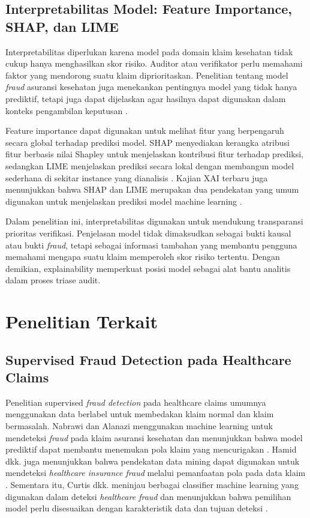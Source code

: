 \subsection{Interpretabilitas Model: Feature Importance, SHAP, dan LIME}\label{interpretabilitas-model-feature-importance-shap-dan-lime}

Interpretabilitas diperlukan karena model pada domain klaim kesehatan tidak cukup hanya menghasilkan skor risiko. Auditor atau verifikator perlu memahami faktor yang mendorong suatu klaim diprioritaskan. Penelitian tentang model \emph{fraud} asuransi kesehatan juga menekankan pentingnya model yang tidak hanya prediktif, tetapi juga dapat dijelaskan agar hasilnya dapat digunakan dalam konteks pengambilan keputusan \citep{wang2025}.

Feature importance dapat digunakan untuk melihat fitur yang berpengaruh secara global terhadap prediksi model. SHAP menyediakan kerangka atribusi fitur berbasis nilai Shapley untuk menjelaskan kontribusi fitur terhadap prediksi, sedangkan LIME menjelaskan prediksi secara lokal dengan membangun model sederhana di sekitar instance yang dianalisis \citep{lundberg2017,ribeiro2016}. Kajian XAI terbaru juga menunjukkan bahwa SHAP dan LIME merupakan dua pendekatan yang umum digunakan untuk menjelaskan prediksi model machine learning \citep{salih2025}.

Dalam penelitian ini, interpretabilitas digunakan untuk mendukung transparansi prioritas verifikasi. Penjelasan model tidak dimaksudkan sebagai bukti kausal atau bukti \emph{fraud}, tetapi sebagai informasi tambahan yang membantu pengguna memahami mengapa suatu klaim memperoleh skor risiko tertentu. Dengan demikian, explainability memperkuat posisi model sebagai alat bantu analitis dalam proses triase audit.

\section{Penelitian Terkait}\label{penelitian-terkait}

\subsection{Supervised Fraud Detection pada Healthcare Claims}\label{supervised-fraud-detection-pada-healthcare-claims}

Penelitian supervised \emph{fraud detection} pada healthcare claims umumnya menggunakan data berlabel untuk membedakan klaim normal dan klaim bermasalah. Nabrawi dan Alanazi menggunakan machine learning untuk mendeteksi \emph{fraud} pada klaim asuransi kesehatan dan menunjukkan bahwa model prediktif dapat membantu menemukan pola klaim yang mencurigakan \citep{nabrawi2023}. Hamid dkk. juga menunjukkan bahwa pendekatan data mining dapat digunakan untuk mendeteksi \emph{healthcare insurance fraud} melalui pemanfaatan pola pada data klaim \citep{hamid2024}. Sementara itu, Curtis dkk. meninjau berbagai classifier machine learning yang digunakan dalam deteksi \emph{healthcare fraud} dan menunjukkan bahwa pemilihan model perlu disesuaikan dengan karakteristik data dan tujuan deteksi \citep{curtis2025}.

